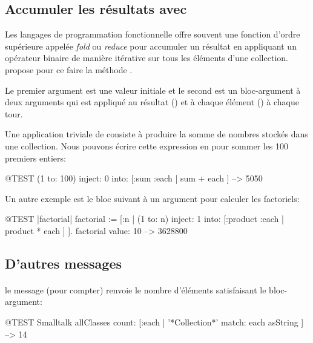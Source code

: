 \documentclass[a4paper,10pt,twoside]{book}
\begin{document}
\subsection{Accumuler les r\'esultats avec }
Les langages de programmation fonctionnelle offre souvent une fonction d'ordre
sup\'erieure appel\'ee \emph{fold} ou \emph{reduce} pour accumuler un r\'esultat
en appliquant un op\'erateur binaire de mani\`ere it\'erative sur tous les
\'el\'ements d'une collection.
\sq propose pour ce faire la m\'ethode .

Le premier argument est une valeur initiale et le second est un bloc-argument
\`a deux arguments qui est appliqu\'e au r\'esultat () et \`a chaque \'el\'ement () \`a chaque tour.

Une application triviale de   consiste \`a produire 
la somme de nombres stock\'es dans une collection.
Nous pouvons \'ecrire cette expression en \sq pour sommer
les 100 premiers entiers:
\begin{code}{@TEST}
(1 to: 100) inject: 0 into: [:sum :each | sum + each ] --> 5050
\end{code}

Un autre exemple est le bloc suivant \`a un argument pour calculer les factoriels:
\begin{code}{@TEST |factorial|}
factorial := [:n | (1 to: n) inject: 1 into: [:product :each | product * each ] ].
factorial value: 10 --> 3628800
\end{code}

\subsection{D'autres messages}

\paragraph{} le message  (pour compter) renvoie le nombre d'\'el\'ements satisfaisant le bloc-argument: %

\begin{code}{@TEST}
Smalltalk allClasses count: [:each | '*Collection*' match: each asString ] --> 14
\end{code}
\end{document}
